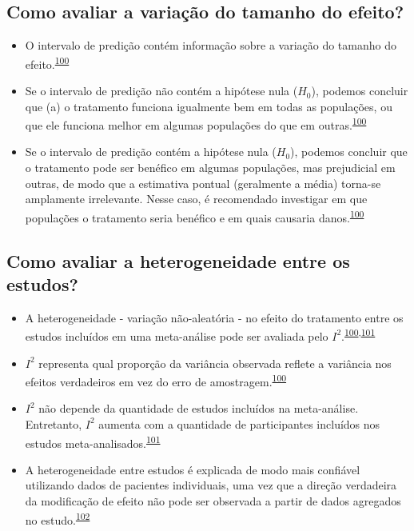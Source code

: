 \documentclass[
]{book}
\begin{document}
\hypertarget{como-avaliar-a-variauxe7uxe3o-do-tamanho-do-efeito}{%
\subsection{Como avaliar a variação do tamanho do efeito?}\label{como-avaliar-a-variauxe7uxe3o-do-tamanho-do-efeito}}

\begin{itemize}
\item
  O intervalo de predição contém informação sobre a variação do tamanho do efeito.\textsuperscript{\protect\hyperlink{ref-Borenstein2022}{100}}
\item
  Se o intervalo de predição não contém a hipótese nula (\(H_{0}\)), podemos concluir que (a) o tratamento funciona igualmente bem em todas as populações, ou que ele funciona melhor em algumas populações do que em outras.\textsuperscript{\protect\hyperlink{ref-Borenstein2022}{100}}
\item
  Se o intervalo de predição contém a hipótese nula (\(H_{0}\)), podemos concluir que o tratamento pode ser benéfico em algumas populações, mas prejudicial em outras, de modo que a estimativa pontual (geralmente a média) torna-se amplamente irrelevante. Nesse caso, é recomendado investigar em que populações o tratamento seria benéfico e em quais causaria danos.\textsuperscript{\protect\hyperlink{ref-Borenstein2022}{100}}
\end{itemize}

\hypertarget{como-avaliar-a-heterogeneidade-entre-os-estudos}{%
\subsection{Como avaliar a heterogeneidade entre os estudos?}\label{como-avaliar-a-heterogeneidade-entre-os-estudos}}

\begin{itemize}
\item
  A heterogeneidade - variação não-aleatória - no efeito do tratamento entre os estudos incluídos em uma meta-análise pode ser avaliada pelo \(I^{2}\).\textsuperscript{\protect\hyperlink{ref-Borenstein2022}{100},\protect\hyperlink{ref-Ruxfccker2008}{101}}
\item
  \(I^{2}\) representa qual proporção da variância observada reflete a variância nos efeitos verdadeiros em vez do erro de amostragem.\textsuperscript{\protect\hyperlink{ref-Borenstein2022}{100}}
\item
  \(I^{2}\) não depende da quantidade de estudos incluídos na meta-análise. Entretanto, \(I^{2}\) aumenta com a quantidade de participantes incluídos nos estudos meta-analisados.\textsuperscript{\protect\hyperlink{ref-Ruxfccker2008}{101}}
\item
  A heterogeneidade entre estudos é explicada de modo mais confiável utilizando dados de pacientes individuais, uma vez que a direção verdadeira da modificação de efeito não pode ser observada a partir de dados agregados no estudo.\textsuperscript{\protect\hyperlink{ref-degrooth2023}{102}}
\end{itemize}
\end{document}
